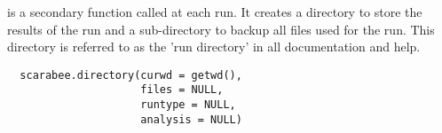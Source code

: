 %
\begin{Description}\relax
{} is a secondary function called at each 
 run. It creates a directory to store the results of the run and
a sub-directory to backup all files used for the run. This directory is
referred to as the 'run directory' in all  documentation and
help.
\end{Description}
%
\begin{Usage}
\begin{verbatim}
  scarabee.directory(curwd = getwd(),
                     files = NULL,
                     runtype = NULL,
                     analysis = NULL)
\end{verbatim}
\end{Usage}
%
